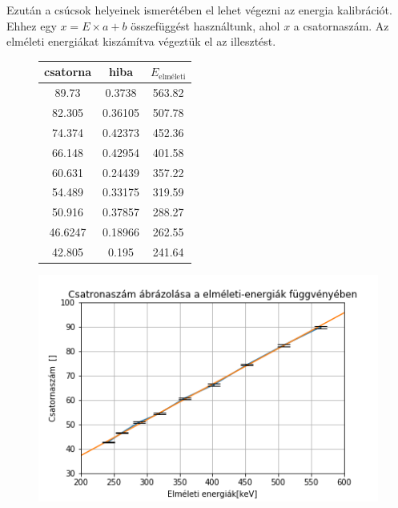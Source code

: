 \documentclass[a4paper,12pt]{article}
\begin{document}
\par Ezután a csúcsok helyeinek ismerétében el lehet végezni az energia kalibrációt. Ehhez egy $x = E\times a + b$ összefüggést használtunk, ahol $x$ a csatornaszám. Az elméleti energiákat kiszámítva végeztük el az illesztést.

\begin{figure}[!htb]
    \begin{minipage}{.39\textwidth}
    \begin{center}
	\begin{tabular}{|c|c|c|}
		\hline
		csatorna & hiba & $E_{\text{elméleti}}$ \\
		\hline
		89.73 & 0.3738 & 563.82 \\
		\hline
		82.305 & 0.36105 & 507.78 \\
		\hline
		74.374 & 0.42373 & 452.36 \\
		\hline
		66.148 & 0.42954 & 401.58 \\
		\hline
		60.631 & 0.24439 & 357.22 \\
		\hline
		54.489 & 0.33175 & 319.59 \\
		\hline
		50.916 & 0.37857 & 288.27 \\
		\hline
		46.6247 & 0.18966 & 262.55 \\
		\hline
		42.805 & 0.195 & 241.64 \\
		\hline
	\end{tabular}
	\end{center}
	\end{minipage}
    \begin{minipage}{.69\textwidth}
        \centering
        \includegraphics[width=1.\linewidth]{ch_en.png}
    \end{minipage}
\end{figure}
\end{document}

